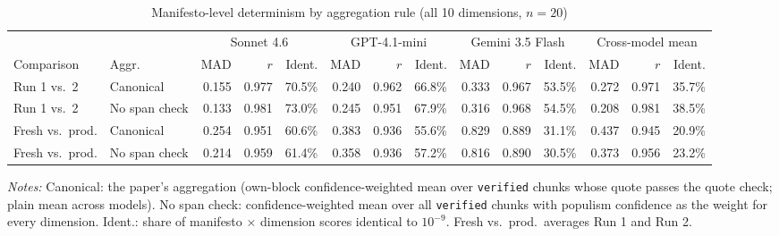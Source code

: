 \begin{table}[ht]
\centering
\caption{Manifesto-level determinism by aggregation rule (all 10 dimensions, $n=20$)}
\label{tab:verify_aggregation}
\scriptsize
\setlength{\tabcolsep}{3pt}
\begin{tabular}{llrrrrrrrrrrrr}
\toprule
 & & \multicolumn{3}{c}{Sonnet 4.6} & \multicolumn{3}{c}{GPT-4.1-mini} & \multicolumn{3}{c}{Gemini 3.5 Flash} & \multicolumn{3}{c}{Cross-model mean} \\
\cmidrule(lr){3-5}\cmidrule(lr){6-8}\cmidrule(lr){9-11}\cmidrule(lr){12-14}
Comparison & Aggr. & MAD & $r$ & Ident. & MAD & $r$ & Ident. & MAD & $r$ & Ident. & MAD & $r$ & Ident. \\
\midrule
Run 1 vs.\ 2 & Canonical & 0.155 & 0.977 & 70.5\% & 0.240 & 0.962 & 66.8\% & 0.333 & 0.967 & 53.5\% & 0.272 & 0.971 & 35.7\% \\
Run 1 vs.\ 2 & No span check & 0.133 & 0.981 & 73.0\% & 0.245 & 0.951 & 67.9\% & 0.316 & 0.968 & 54.5\% & 0.208 & 0.981 & 38.5\% \\
Fresh vs.\ prod. & Canonical & 0.254 & 0.951 & 60.6\% & 0.383 & 0.936 & 55.6\% & 0.829 & 0.889 & 31.1\% & 0.437 & 0.945 & 20.9\% \\
Fresh vs.\ prod. & No span check & 0.214 & 0.959 & 61.4\% & 0.358 & 0.936 & 57.2\% & 0.816 & 0.890 & 30.5\% & 0.373 & 0.956 & 23.2\% \\
\bottomrule
\end{tabular}
\par\smallskip\parbox{0.95\linewidth}{\scriptsize\textit{Notes:} Canonical: the paper's aggregation (own-block confidence-weighted mean over \texttt{verified} chunks whose quote passes the quote check; plain mean across models). No span check: confidence-weighted mean over all \texttt{verified} chunks with populism confidence as the weight for every dimension. Ident.: share of manifesto $\times$ dimension scores identical to $10^{-9}$. Fresh vs.\ prod.\ averages Run 1 and Run 2.}
\end{table}
